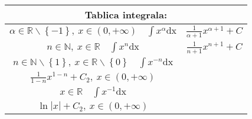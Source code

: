\documentclass{article}
\begin{document}
\setlength{\tabcolsep}{2.55em}
\renewcommand{\arraystretch}{2}
\begin{tabular}{ |c|c| }
    \hline
    \multicolumn{2}{|c|}{Tablica integrala:}                                                                                                                                                                                                              \\ \hline
    $\displaystyle\alpha \in \mathbb{R} \backslash \left\{-1\right\},\ x\in\left(0, +\infty\right)\quad \int x^{\alpha} \text{dx}$                   & $\displaystyle\frac{1}{\alpha + 1} x^{\alpha + 1} + C$                                             \\ \hline
    $\displaystyle n \in \mathbb{N},\ x \in \mathbb{R} \quad \int x^{n} \text{dx}$                                                                   & $\displaystyle\frac{1}{n + 1} x^{n + 1} + C$                                                       \\ \hline
    $\displaystyle n \in \mathbb{N}\backslash\left\{1\right\},\ x \in\mathbb{R}\backslash\left\{0\right\}\quad \int x^{-n} \text{dx} $               &
    \makecell{
    $\displaystyle\frac{1}{1-n} x^{1-n} + C_1,\ x \in \left(-\infty, 0\right)$                                                                                                                                                                            \\
        $\displaystyle\frac{1}{1-n} x^{1-n} + C_2,\ x \in \left(0, +\infty\right)$
    }                                                                                                                                                                                                                                                     \\  \hline
    $\displaystyle x \in \mathbb{R} \quad \int x^{-1} \text{dx}$                                                                                     &
    \makecell{ $\ln |x| + C_1,\ x \in \left(-\infty, 0\right)$                                                                                                                                                                                            \\
    $\displaystyle\ln |x| + C_2,\ x \in \left(0, +\infty\right)$}                                                                                                                                                                                         \\ \hline

\end{tabular}
\end{document}
